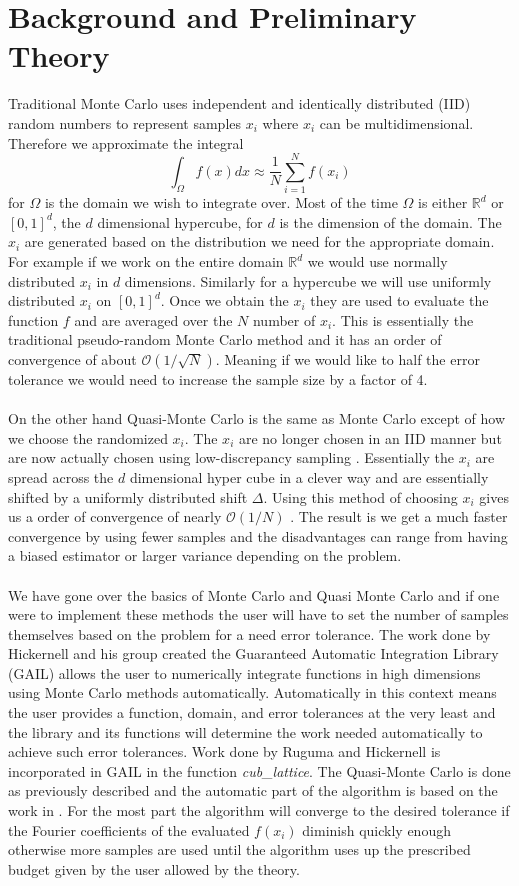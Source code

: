 \documentclass[12pt,letterpaper]{article}
\begin{document}
\section{Background and Preliminary Theory}
Traditional Monte Carlo uses independent and identically distributed (IID) random numbers to represent samples $x_i$ where $x_i$ can be multidimensional. Therefore we approximate the integral
\[
	\int_{\Omega}f(x)dx \approx \frac{1}{N}\sum_{i=1}^{N}f(x_i)
\]
for $\Omega$ is the domain we wish to integrate over. Most of the time $\Omega$ is either $\mathbb{R}^d$ or $[0,1]^d$, the $d$ dimensional hypercube, for $d$ is the dimension of the domain. The $x_i$ are generated based on the distribution we need for the appropriate domain. For example if we work on the entire domain $\mathbb{R}^d$ we would use normally distributed $x_i$ in $d$ dimensions. Similarly for a hypercube we will use uniformly distributed $x_i$ on $[0,1]^d$. Once we obtain the $x_i$ they are used to evaluate the function $f$ and are averaged over the $N$ number of $x_i$. This is essentially the traditional pseudo-random Monte Carlo method and it has an order of convergence of about $\mathcal{O}(1/\sqrt{N})$. Meaning if we would like to half the error tolerance we would need to increase the sample size by a factor of 4.
\\
\\
On the other hand Quasi-Monte Carlo is the same as Monte Carlo except of how we choose the randomized $x_i$. The $x_i$ are no longer chosen in an IID manner but are now actually chosen using low-discrepancy sampling \cite{toni}. Essentially the $x_i$ are spread across the $d$ dimensional hyper cube in a clever way and are essentially shifted by a uniformly distributed shift $\Delta$. Using this method of choosing $x_i$ gives us a order of convergence of nearly $\mathcal{O}(1/N)$ \cite{toni}. The result is we get a much faster convergence by using fewer samples and the disadvantages can range from having a biased estimator or larger variance depending on the problem.
\\
\\
We have gone over the basics of Monte Carlo and Quasi Monte Carlo and if one were to implement these methods the user will have to set the number of samples themselves based on the problem for a need error tolerance. The work done by Hickernell and his group \cite{GAIL} created the Guaranteed Automatic Integration Library (GAIL) allows the user to numerically integrate functions in high dimensions using Monte Carlo methods automatically. Automatically in this context means the user provides a function, domain, and error tolerances at the very least and the library and its functions will determine the work needed automatically to achieve such error tolerances. Work done by Ruguma and Hickernell \cite{toni} is incorporated in GAIL in the function \textit{cub\_lattice}. The Quasi-Monte Carlo is done as previously described and the automatic part of the algorithm is based on the work in \cite{toni}. For the most part the algorithm will converge to the desired tolerance if the Fourier coefficients of the evaluated $f(x_i)$ diminish quickly enough otherwise more samples are used until the algorithm uses up the prescribed budget given by the user allowed by the theory. 
\end{document}

